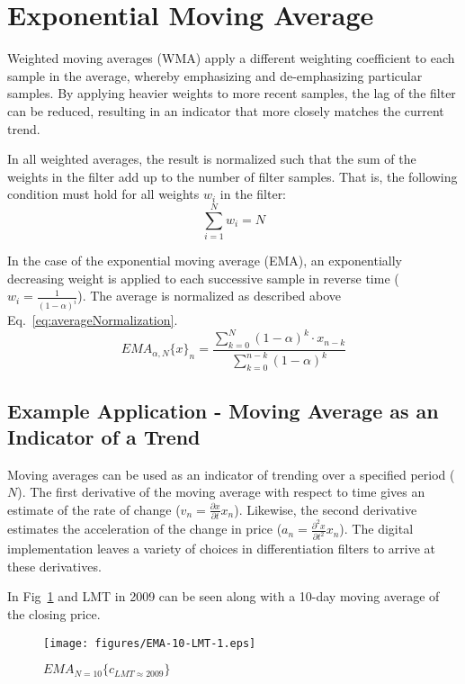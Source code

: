 \section{Exponential Moving Average}
Weighted moving averages (WMA) apply a different weighting coefficient to each sample in the average, whereby emphasizing and de-emphasizing particular samples.  By applying heavier weights to more recent samples, the lag of the filter can be reduced, resulting in an indicator that more closely matches the current trend.  
\par
In all weighted averages, the result is normalized such that the sum of the weights in the filter add up to the number of filter samples.  That is, the following condition must hold for all weights $w_{i}$ in the filter:
\begin{equation}
\label{eq:averageNormalization}
\sum\limits_{i=1}^{N}w_{i}=N
\end{equation}
\par
In the case of the exponential moving average (EMA), an exponentially decreasing weight is applied to each successive sample in reverse time ($w_{i}=\frac{1}{(1-\alpha)^{i}}$).  The average is normalized as described above Eq.~\eqref{eq:averageNormalization}.
\begin{equation}
EMA_{\alpha,N}\{x\}_{n}=\frac{\sum\limits_{k=0}^{N}(1-\alpha)^{k}\cdot x_{n-k}}{\sum\limits_{k=0}^{n-k}(1-\alpha)^{k}}
\end{equation}

\subsection{Example Application - Moving Average as an Indicator of a Trend}
Moving averages can be used as an indicator of trending over a specified period ($N$).  The first derivative of the moving average with respect to time gives an estimate of the rate of change ($v_{n}=\frac{\partial x}{\partial t}x_{n}$).  Likewise, the second derivative estimates the acceleration of the change in price ($a_{n}=\frac{\partial^2 x}{\partial t^2}x_{n}$).  The digital implementation leaves a variety of choices in differentiation filters to arrive at these derivatives.
\par
In Fig~\ref{MA} and LMT in 2009 can be seen along with a 10-day moving average of the closing price.
\begin{figure}[ht]\centering
\label{MA}
\texttt{[image: figures/EMA-10-LMT-1.eps]}
\caption{$EMA_{N=10}\{c_{LMT \approx 2009}\}$}
\end{figure}

